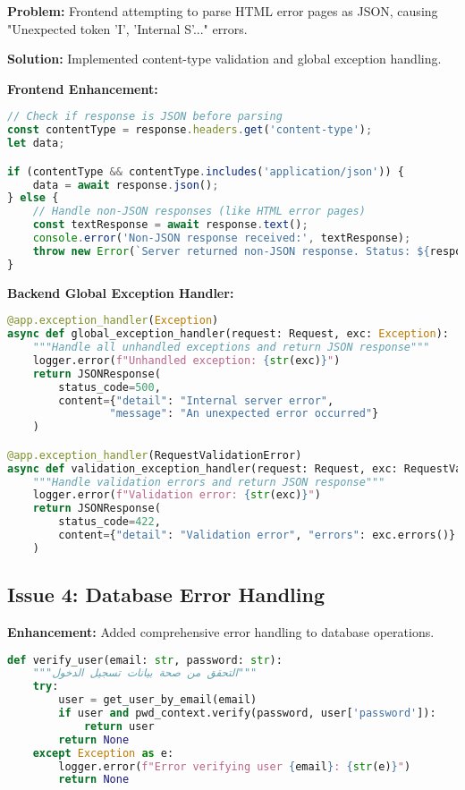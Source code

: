 \documentclass[12pt,a4paper]{article}
\begin{document}
\textbf{Problem:} Frontend attempting to parse HTML error pages as JSON, causing "Unexpected token 'I', 'Internal S'..." errors.

\textbf{Solution:} Implemented content-type validation and global exception handling.

\textbf{Frontend Enhancement:}
\begin{lstlisting}[language=JavaScript, caption=Enhanced Login Error Handling]
// Check if response is JSON before parsing
const contentType = response.headers.get('content-type');
let data;

if (contentType && contentType.includes('application/json')) {
    data = await response.json();
} else {
    // Handle non-JSON responses (like HTML error pages)
    const textResponse = await response.text();
    console.error('Non-JSON response received:', textResponse);
    throw new Error(`Server returned non-JSON response. Status: ${response.status}`);
}
\end{lstlisting}

\textbf{Backend Global Exception Handler:}
\begin{lstlisting}[language=Python, caption=FastAPI Global Exception Handler]
@app.exception_handler(Exception)
async def global_exception_handler(request: Request, exc: Exception):
    """Handle all unhandled exceptions and return JSON response"""
    logger.error(f"Unhandled exception: {str(exc)}")
    return JSONResponse(
        status_code=500,
        content={"detail": "Internal server error", 
                "message": "An unexpected error occurred"}
    )

@app.exception_handler(RequestValidationError)
async def validation_exception_handler(request: Request, exc: RequestValidationError):
    """Handle validation errors and return JSON response"""
    logger.error(f"Validation error: {str(exc)}")
    return JSONResponse(
        status_code=422,
        content={"detail": "Validation error", "errors": exc.errors()}
    )
\end{lstlisting}

\subsection{Issue 4: Database Error Handling}

\textbf{Enhancement:} Added comprehensive error handling to database operations.

\begin{lstlisting}[language=Python, caption=Enhanced Database Error Handling]
def verify_user(email: str, password: str):
    """التحقق من صحة بيانات تسجيل الدخول"""
    try:
        user = get_user_by_email(email)
        if user and pwd_context.verify(password, user['password']):
            return user
        return None
    except Exception as e:
        logger.error(f"Error verifying user {email}: {str(e)}")
        return None
\end{lstlisting}
\end{document}
